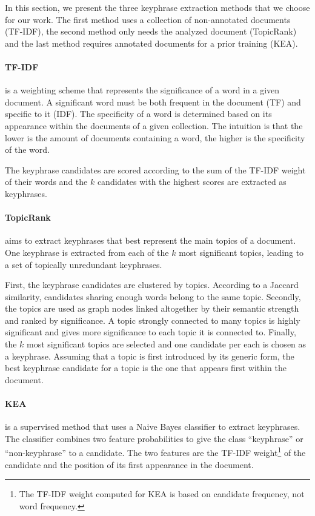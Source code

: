  In this section, we present the three keyphrase extraction methods that we
  choose for our work. The first method uses a collection of non-annotated
  documents (TF-IDF), the second method only needs the analyzed document
  (TopicRank) and the last method requires annotated documents for a prior
  training (KEA).

  \paragraph{TF-IDF~\textnormal{\cite{jones1972tfidf}}} is a weighting scheme
  that represents the significance of a word in a given document. A significant
  word must be both frequent in the document (TF) and specific to it (IDF). The
  specificity of a word is determined based on its appearance within the
  documents of a given collection. The intuition is that the lower is the amount
  of documents containing a word, the higher is the specificity of the word.

  The keyphrase candidates are scored according to the sum of the TF-IDF weight
  of their words and the $k$ candidates with the highest scores are extracted as
  keyphrases.

  \paragraph{TopicRank~\textnormal{\cite{bougouin2013topicrank}}} aims to
  extract keyphrases that best represent the main topics of a document. One
  keyphrase is extracted from each of the $k$ most significant topics, leading
  to a set of topically unredundant keyphrases.

  First, the keyphrase candidates are clustered by topics. According to a
  Jaccard similarity, candidates sharing enough words belong to the same topic.
  Secondly, the topics are used as graph nodes linked altogether by their
  semantic strength and ranked by significance. A topic strongly connected to
  many topics is highly significant and gives more significance to each topic
  it is connected to. Finally, the $k$ most significant topics are selected and
  one candidate per each is chosen as a keyphrase. Assuming that a topic is
  first introduced by its generic form, the best keyphrase candidate for a topic
  is the one that appears first within the document.

  \paragraph{KEA~\textnormal{\cite{witten1999kea}}} is a supervised method that
  uses a Naive Bayes classifier to extract keyphrases. The classifier combines
  two feature probabilities to give the class ``keyphrase'' or ``non-keyphrase''
  to a candidate. The two features are the TF-IDF weight\footnote{The TF-IDF
  weight computed for KEA is based on candidate frequency, not word frequency.}
  of the candidate and the position of its first appearance in the document.

